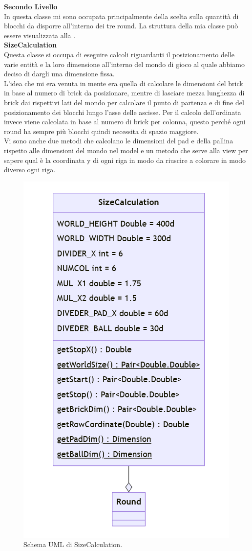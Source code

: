 \documentclass[a4paper,12pt]{report}
\begin{document}
\textbf{Secondo Livello}\\
In questa classe mi sono occupata principalmente della scelta sulla quantità di blocchi da disporre all'interno dei tre round. La struttura della mia classe può essere
visualizzata alla .\\
\textbf{SizeCalculation}\\
Questa classe si occupa di eseguire calcoli riguardanti il posizionamento delle varie entità e la loro dimensione all'interno del mondo di gioco al
quale abbiamo deciso di dargli una dimensione fissa.
\\L'idea che mi era venuta in mente era quella di calcolare le dimensioni del brick in base al numero di brick da posizionare, mentre di lasciare mezza lunghezza di brick dai rispettivi
lati del mondo per calcolare il punto di partenza e di fine del posizionamento dei blocchi lungo l'asse delle ascisse. Per il calcolo dell'ordinata invece viene calcolata in base al numero di brick per colonna,
questo perché ogni round ha sempre più blocchi quindi necessita di spazio maggiore.
\\Vi sono anche due metodi che calcolano le dimensioni del pad e della pallina rispetto alle dimensioni del mondo nel model e un metodo che serve alla view per sapere qual è
la coordinata y di ogni riga in modo da riuscire a colorare in modo diverso ogni riga.
\begin{figure}[H]
    \centering{}
    \includegraphics[scale=0.5]{images/SizeCalculation.png}
    \caption{Schema UML di SizeCalculation.}
    \label{images:SizeCalculation}
\end{figure}
\end{document}
